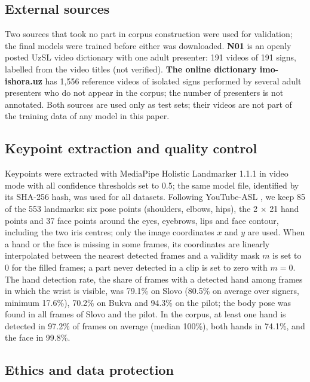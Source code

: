 \documentclass[a4paper,fleqn]{cas-dc}
\begin{document}
\hypertarget{external-sources}{%
\subsection{External sources}\label{external-sources}}

Two sources that took no part in corpus construction were used for validation; the final models were trained before either was downloaded. \textbf{N01} is an openly posted UzSL video dictionary with one adult presenter: 191 videos of 191 signs, labelled from the video titles (not verified). \textbf{The online dictionary imo-ishora.uz} has 1,556 reference videos of isolated signs performed by several adult presenters who do not appear in the corpus; the number of presenters is not annotated. Both sources are used only as test sets; their videos are not part of the training data of any model in this paper.

\hypertarget{keypoint-extraction-and-quality-control}{%
\subsection{Keypoint extraction and quality control}\label{keypoint-extraction-and-quality-control}}

Keypoints were extracted with MediaPipe Holistic Landmarker 1.1.1 \cite{docs_mediapipe_holistic_landmarker} in video mode with all confidence thresholds set to 0.5; the same model file, identified by its SHA-256 hash, was used for all datasets. Following YouTube-ASL \cite{2023_uthus_youtube_asl}, we keep 85 of the 553 landmarks: six pose points (shoulders, elbows, hips), the 2 $\times$ 21 hand points and 37 face points around the eyes, eyebrows, lips and face contour, including the two iris centres; only the image coordinates \(x\) and \(y\) are used. When a hand or the face is missing in some frames, its coordinates are linearly interpolated between the nearest detected frames and a validity mask \(m\) is set to 0 for the filled frames; a part never detected in a clip is set to zero with \(m = 0\). The hand detection rate, the share of frames with a detected hand among frames in which the wrist is visible, was 79.1\% on Slovo (80.5\% on average over signers, minimum 17.6\%), 70.2\% on Bukva and 94.3\% on the pilot; the body pose was found in all frames of Slovo and the pilot. In the corpus, at least one hand is detected in 97.2\% of frames on average (median 100\%), both hands in 74.1\%, and the face in 99.8\%.

\hypertarget{ethics-and-data-protection}{%
\subsection{Ethics and data protection}\label{ethics-and-data-protection}}
\end{document}
